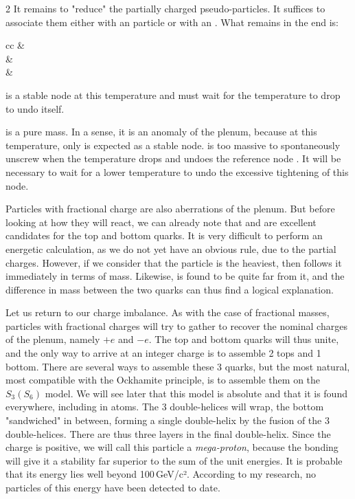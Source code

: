 \begin{multicols}{2}
	It remains to "reduce" the partially charged pseudo-particles. It suffices to associate them either with an  particle or with an . What remains in the end is:
	
	\begin{center}
		\begin{tblr}{cc}
			  &    \\
			 &  \\
			 &  \\
		\end{tblr}
	\end{center}
	
	 is a stable node at this temperature and must wait for the temperature to drop to undo itself.
	
	 is a pure mass. In a sense, it is an anomaly of the plenum, because at this temperature, only  is expected as a stable node.  is too massive to spontaneously unscrew when the temperature drops and undoes the reference node . It will be necessary to wait for a lower temperature to undo the excessive tightening of this node.
	
	Particles with fractional charge are also aberrations of the plenum. But before looking at how they will react, we can already note that  and  are excellent candidates for the top and bottom quarks. It is very difficult to perform an energetic calculation, as we do not yet have an obvious rule, due to the partial charges. However, if we consider that the  particle is the heaviest, then  follows it immediately in terms of mass. Likewise,  is found to be quite far from it, and the difference in mass between the two quarks can thus find a logical explanation.
	\medskip
	
	Let us return to our charge imbalance. As with the case of fractional masses, particles with fractional charges will try to gather to recover the nominal charges of the plenum, namely $+e$ and $-e$. The top and bottom quarks will thus unite, and the only way to arrive at an integer charge is to assemble 2 tops and 1 bottom. There are several ways to assemble these 3 quarks, but the most natural, most compatible with the Ockhamite principle, is to assemble them on the $S_3(S_6)$ model. We will see later that this model is absolute and that it is found everywhere, including in atoms. The 3 double-helices will wrap, the bottom "sandwiched" in between, forming a single double-helix by the fusion of the 3 double-helices. There are thus three layers in the final double-helix. Since the charge is positive, we will call this particle a \textit{mega-proton}, because the bonding will give it a stability far superior to the sum of the unit energies. It is probable that its energy lies well beyond 100\,GeV/c². According to my research, no particles of this energy have been detected to date.
	

\end{multicols}

